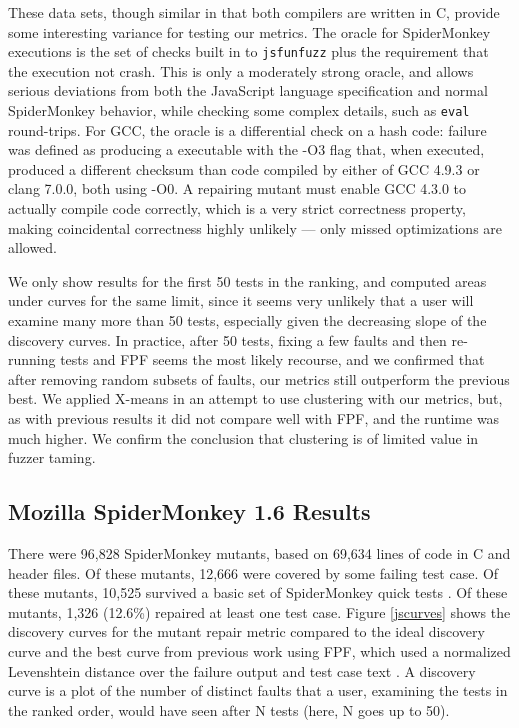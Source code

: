 These data sets, though similar in that both compilers are written in C, provide some interesting variance for testing our metrics.  The oracle for SpiderMonkey executions is the set of checks built in to {\tt jsfunfuzz} plus the requirement that the execution not crash.  This is only a moderately strong oracle, and allows serious deviations from both the JavaScript language specification and normal SpiderMonkey behavior, while checking some complex details, such as {\tt eval} round-trips.  For GCC, the oracle is a differential check on a hash code:  failure was defined as producing a executable with the -O3 flag that, when executed, produced a different checksum than code compiled by either of GCC 4.9.3 or clang 7.0.0, both using -O0.  A repairing mutant must enable GCC 4.3.0 to actually compile code correctly, which is a very strict correctness property, making coincidental correctness \cite{CCT} highly unlikely --- only missed optimizations are allowed.

We only show results for the first 50 tests in the ranking, and computed areas under curves for the same limit, since it seems very unlikely that a user will examine many more than 50 tests, especially given the decreasing slope of the discovery curves.  In practice, after 50 tests, fixing a few faults and then re-running tests and FPF seems the most likely recourse, and we confirmed that after removing random subsets of faults, our metrics still outperform the previous best.  We applied X-means \cite{xmeans} in an attempt to use clustering with our metrics, but, as with previous results \cite{PLDI13} it did not compare well with FPF, and the runtime was much higher.  We confirm the conclusion \cite{PLDI13} that clustering is of limited value in fuzzer taming.

\subsection{Mozilla SpiderMonkey 1.6 Results}


There were 96,828 SpiderMonkey mutants, based on 69,634 lines of code in C and header files.  Of these mutants, 12,666 were covered by some failing test case.  Of these mutants, 10,525 survived a basic set of SpiderMonkey quick tests \cite{icst2014}.  Of these mutants, 1,326 (12.6\%) repaired at least one test case.  Figure \ref{jscurves} shows the discovery curves for the mutant repair metric compared to the ideal discovery curve and the best curve from previous work using FPF, which used a normalized Levenshtein distance \cite{lev} over the failure output and test case text \cite{PLDI13}.  A discovery curve is a plot of the number of distinct faults that a user, examining the tests in the ranked order, would have seen after N tests (here, N goes up to 50).

